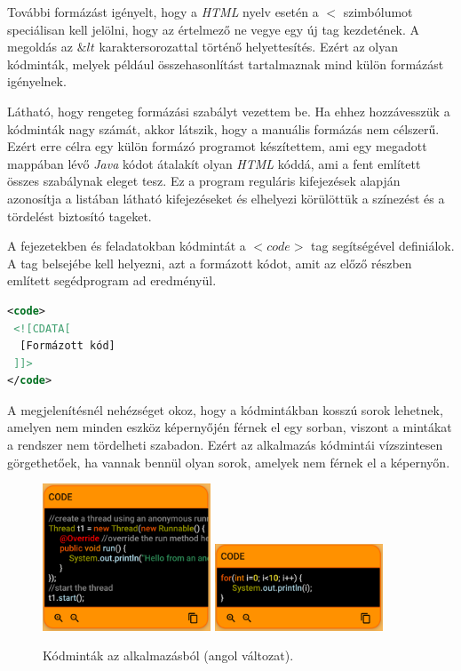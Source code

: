 \documentclass[12pt,a4paper]{article}
\begin{document}
	További formázást igényelt, hogy a \textit{HTML} nyelv esetén a $<$ szimbólumot speciálisan kell jelölni, hogy az értelmező ne vegye egy új tag kezdetének. A megoldás az $\&lt$ karaktersorozattal történő helyettesítés. Ezért az olyan kódminták, melyek például összehasonlítást tartalmaznak mind külön formázást igényelnek.
	
	Látható, hogy rengeteg formázási szabályt vezettem be. Ha ehhez hozzávesszük a kódminták nagy számát, akkor látszik, hogy a manuális formázás nem célszerű. Ezért erre  célra egy külön formázó programot készítettem, ami egy megadott mappában lévő \textit{Java} kódot átalakít olyan \textit{HTML} kóddá, ami a fent említett összes szabálynak eleget tesz. Ez a program reguláris kifejezések alapján azonosítja a listában látható kifejezéseket és elhelyezi körülöttük a színezést és a tördelést biztosító tageket.  
	
	A fejezetekben és feladatokban kódmintát a $<code>$ tag segítségével definiálok. A tag belsejébe kell helyezni, azt a formázott kódot, amit az előző részben említett segédprogram ad eredményül.
	
	\bigskip
	\begin{lstlisting}[language=XML]
<code>
 <![CDATA[
  [Formázott kód]
 ]]>
</code>	
	\end{lstlisting}
	\bigskip
	
	A megjelenítésnél nehézséget okoz, hogy a kódmintákban kosszú sorok lehetnek, amelyen nem minden eszköz képernyőjén férnek el egy sorban, viszont a mintákat a rendszer nem tördelheti szabadon. Ezért az alkalmazás kódmintái vízszintesen görgethetőek, ha vannak bennül olyan sorok, amelyek nem férnek el a képernyőn.
	
	\begin{figure}
		\centering
		\includegraphics[width=5cm]{code_component_1}
		\includegraphics[width=5cm]{code_component_2}
		\caption{Kódminták az alkalmazásból (angol változat).}
		\label{code_component_figure}
	\end{figure}
	
\end{document}

